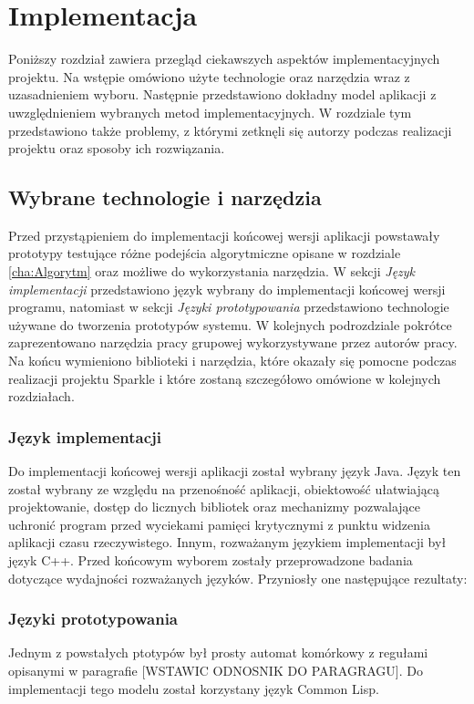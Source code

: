 ﻿\chapter {Implementacja}
\label{cha:implementacja}
Poniższy rozdział zawiera przegląd ciekawszych aspektów implementacyjnych projektu.
Na wstępie omówiono użyte technologie oraz narzędzia wraz z uzasadnieniem wyboru. Następnie przedstawiono dokładny model aplikacji z uwzględnieniem wybranych metod implementacyjnych. 
W rozdziale tym przedstawiono także problemy, z którymi zetknęli się autorzy podczas realizacji projektu oraz sposoby ich rozwiązania.
\section {Wybrane technologie i narzędzia}
Przed przystąpieniem do implementacji końcowej wersji aplikacji powstawały prototypy testujące różne podejścia algorytmiczne opisane w rozdziale \ref{cha:Algorytm} oraz możliwe do wykorzystania narzędzia. W sekcji \textit{Język implementacji} przedstawiono język wybrany do implementacji końcowej wersji programu, natomiast w sekcji \textit{Języki prototypowania} przedstawiono technologie używane do tworzenia prototypów systemu. 
W kolejnych podrozdziale pokrótce zaprezentowano narzędzia pracy grupowej wykorzystywane przez autorów pracy. Na końcu wymieniono biblioteki i narzędzia, które okazały się pomocne podczas realizacji projektu Sparkle i które zostaną szczegółowo omówione w kolejnych rozdziałach.
\subsection{Język implementacji}
Do implementacji końcowej wersji aplikacji został wybrany język Java.
Język ten został wybrany ze względu na przenośność aplikacji, obiektowość ułatwiającą projektowanie, dostęp do licznych 
bibliotek oraz mechanizmy pozwalające uchronić program przed wyciekami pamięci krytycznymi z punktu widzenia aplikacji czasu rzeczywistego. Innym, rozważanym językiem implementacji był język C++. Przed końcowym wyborem zostały przeprowadzone badania dotyczące wydajności rozważanych języków. Przyniosły one następujące rezultaty:
\begin{itemize}

\end{itemize}

\subsection{Języki prototypowania}
Jednym z powstałych ptotypów był prosty automat komórkowy z regułami opisanymi w paragrafie [WSTAWIC ODNOSNIK DO PARAGRAGU]. Do implementacji tego modelu został korzystany język Common Lisp.

